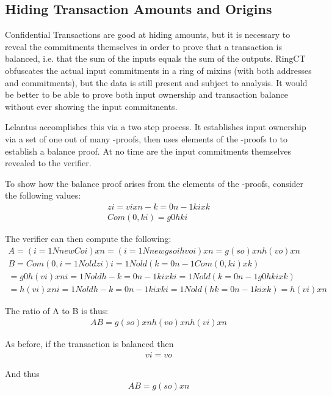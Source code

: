 \documentclass{article}
\begin{document}
\subsection{Hiding Transaction Amounts and Origins}
 
Confidential Transactions are good at hiding amounts, but it is necessary to reveal the commitments themselves in order to prove that a transaction is balanced, i.e. that the sum of the inputs equals the sum of the outputs.  RingCT obfuscates the actual input commitments in a ring of mixins (with both addresses and commitments), but the data is still present and subject to analysis.  It would be better to be able to prove both input ownership and transaction balance without ever showing the input commitments.

Lelantus accomplishes this via a two step process.  It establishes input ownership via a set of one out of many -proofs, then uses elements of the -proofs to to establish a balance proof.  At no time are the input commitments themselves revealed to the verifier.

To show how the balance proof arises from the elements of the -proofs, consider the following values:
\begin{eqnarray}
  zi=vixn-k=0n-1kixk\\
  Com(0,ki)=g0hki
\end{eqnarray}

The verifier can then compute the following:
\begin{eqnarray}
  A=(i=1NnewCoi)xn=(i=1Nnewgsoihvoi)xn=g( so) xnh( vo) xn\\
  B=Com(0,i=1Noldzi) i=1Nold(k=0n-1Com(0,ki)xk)\\
  =g0h( vi) xn i=1Noldh-k=0n-1kixki=1Nold(k=0n-1g0hkixk)\\
  =h( vi) xn i=1Noldh-k=0n-1kixki=1Nold(hk=0n-1kixk)=h( vi) xn
\end{eqnarray}

The ratio of A to B is thus:
\begin{eqnarray}
  AB=g( so) xnh( vo) xnh( vi) xn
\end{eqnarray}
  
As before, if the transaction is balanced then 
\begin{eqnarray}
  vi= vo
\end{eqnarray}

And thus
\begin{eqnarray}
  AB=g( so) xn
\end{eqnarray}
\end{document}
